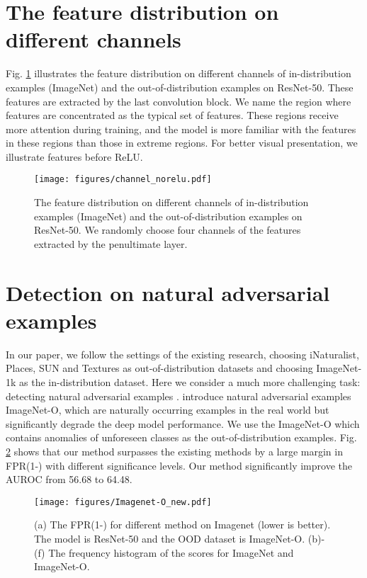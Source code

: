 \documentclass{article}
\begin{document}
\section{The feature distribution on different channels}\label{App:channels}

Fig. \ref{img:channels} illustrates the feature distribution on different channels of in-distribution examples (ImageNet) and the out-of-distribution examples on ResNet-50. These features are extracted by the last convolution block. We name the region where features are concentrated as the typical set of features. These regions receive more attention during training, and the model is more familiar with the features in these regions than those in extreme regions.
For better visual presentation, we illustrate features before ReLU.


\begin{figure}[htbp]
\centering
\texttt{[image: figures/channel\_norelu.pdf]}
\caption{The feature distribution on different channels of in-distribution examples (ImageNet) and the out-of-distribution examples on ResNet-50. We randomly choose four channels of the features extracted by the penultimate layer.}
\label{img:channels}
\end{figure}


\section{Detection on natural adversarial examples}\label{App:NAE}
In our paper, we follow the settings of the existing research, choosing iNaturalist, Places, SUN and Textures as out-of-distribution datasets and choosing ImageNet-1k as the in-distribution dataset. Here we consider a much more challenging task: detecting natural adversarial examples \cite{hendrycks2021nae}. \citet{hendrycks2021nae} introduce natural adversarial examples ImageNet-O, which are naturally occurring examples in the real world but significantly degrade the deep model performance. We use the ImageNet-O \cite{hendrycks2021nae} which contains anomalies of unforeseen classes as the out-of-distribution examples. Fig. \ref{img:imagenet-o} shows that our method surpasses the existing methods by a large margin in FPR(1-) with different significance levels. Our method significantly improve the AUROC from 56.68 to 64.48.

\begin{figure}[htbp]
\centering
\texttt{[image: figures/Imagenet-O\_new.pdf]}
\caption{(a) The FPR(1-) for different method on Imagenet (lower is better). The model is ResNet-50 and the OOD dataset is ImageNet-O. (b)-(f) The frequency histogram of the scores for ImageNet and ImageNet-O.}
\label{img:imagenet-o}
\end{figure}
\end{document}

